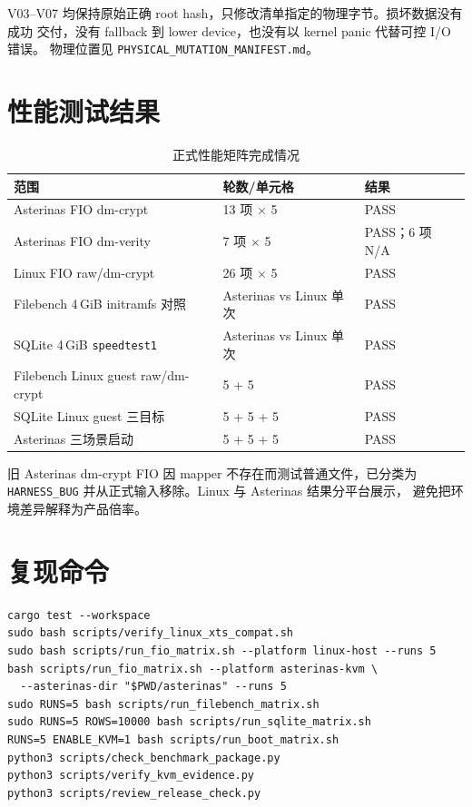V03--V07 均保持原始正确 root hash，只修改清单指定的物理字节。损坏数据没有成功
交付，没有 fallback 到 lower device，也没有以 kernel panic 代替可控 I/O 错误。
物理位置见 \texttt{PHYSICAL\_\allowbreak MUTATION\_\allowbreak MANIFEST.md}。

\section{性能测试结果}

\begin{table}[H]
    \centering
    \caption{正式性能矩阵完成情况}
    \begin{tabular}{p{}p{}p{}}
        \toprule
        \textbf{范围} & \textbf{轮数/单元格} & \textbf{结果} \\
        \midrule
        Asterinas FIO dm-crypt & 13 项 $\times$ 5 & PASS \\
        Asterinas FIO dm-verity & 7 项 $\times$ 5 & PASS；6 项 N/A \\
        Linux FIO raw/dm-crypt & 26 项 $\times$ 5 & PASS \\
        Filebench 4\,GiB initramfs 对照 & Asterinas vs Linux 单次 & PASS \\
        SQLite 4\,GiB \texttt{speedtest1} & Asterinas vs Linux 单次 & PASS \\
        Filebench Linux guest raw/dm-crypt & 5 + 5 & PASS \\
        SQLite Linux guest 三目标 & 5 + 5 + 5 & PASS \\
        Asterinas 三场景启动 & 5 + 5 + 5 & PASS \\
        \bottomrule
    \end{tabular}
\end{table}

旧 Asterinas dm-crypt FIO 因 mapper 不存在而测试普通文件，已分类为
\texttt{HARNESS\_\allowbreak BUG} 并从正式输入移除。Linux 与 Asterinas 结果分平台展示，
避免把环境差异解释为产品倍率。

\section{复现命令}

\begin{lstlisting}[basicstyle=\ttfamily\small, breaklines=true]
cargo test --workspace
sudo bash scripts/verify_linux_xts_compat.sh
sudo bash scripts/run_fio_matrix.sh --platform linux-host --runs 5
bash scripts/run_fio_matrix.sh --platform asterinas-kvm \
  --asterinas-dir "$PWD/asterinas" --runs 5
sudo RUNS=5 bash scripts/run_filebench_matrix.sh
sudo RUNS=5 ROWS=10000 bash scripts/run_sqlite_matrix.sh
RUNS=5 ENABLE_KVM=1 bash scripts/run_boot_matrix.sh
python3 scripts/check_benchmark_package.py
python3 scripts/verify_kvm_evidence.py
python3 scripts/review_release_check.py
\end{lstlisting}

